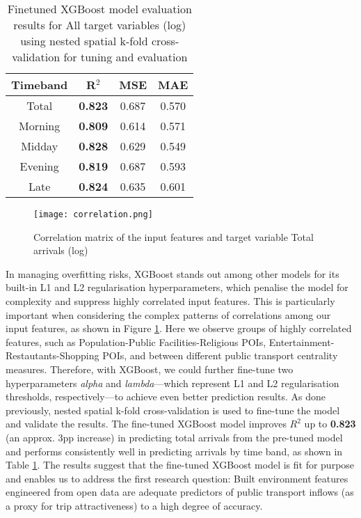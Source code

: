 \begin{table}[ht]
    \centering
    \renewcommand{\arraystretch}{1.5}
    \begin{tabular}{|c|c|c|c|}
        \hline
        \rowcolor{lightgray}
        \textbf{Timeband} & \textbf{R$^2$} & \textbf{MSE} & \textbf{MAE} \\
        \hline
        Total   & \textbf{0.823} & 0.687 & 0.570 \\
        Morning & \textbf{0.809} & 0.614 & 0.571 \\
        Midday  & \textbf{0.828} & 0.629 & 0.549 \\
        Evening & \textbf{0.819} & 0.687 & 0.593 \\
        Late    & \textbf{0.824} & 0.635 & 0.601 \\
        \hline
    \end{tabular}
    \captionsetup{justification=centering}
    \caption{Finetuned XGBoost model evaluation results for All target variables (log)\\using nested spatial k-fold cross-validation for tuning and evaluation}
    \label{tab:modelevaltimeband}
\end{table}

\begin{figure}[!hbt]
    \centering
    \texttt{[image: correlation.png]}
    \captionsetup{justification=centering}
    \caption{Correlation matrix of the input features and target variable Total arrivals (log)}
    \label{fig:corrmatt}
\end{figure}

In managing overfitting risks, XGBoost stands out among other models for its built-in L1 and L2 regularisation hyperparameters, which penalise the model for complexity and suppress highly correlated input features. This is particularly important when considering the complex patterns of correlations among our input features, as shown in Figure \ref{fig:corrmatt}. Here we observe groups of highly correlated features, such as Population-Public Facilities-Religious POIs, Entertainment-Restautants-Shopping POIs, and between different public transport centrality measures. Therefore, with XGBoost, we could further fine-tune two hyperparameters \textit{alpha} and \textit{lambda}---which represent L1 and L2 regularisation thresholds, respectively---to achieve even better prediction results. As done previously, nested spatial k-fold cross-validation is used to fine-tune the model and validate the results. The fine-tuned XGBoost model improves $R^2$ up to \textbf{0.823} (an approx. 3pp increase) in predicting total arrivals from the pre-tuned model and performs consistently well in predicting arrivals by time band, as shown in Table \ref{tab:modelevaltimeband}. The results suggest that the fine-tuned XGBoost model is fit for purpose and enables us to address the first research question: Built environment features engineered from open data are adequate predictors of public transport inflows (as a proxy for trip attractiveness) to a high degree of accuracy.


